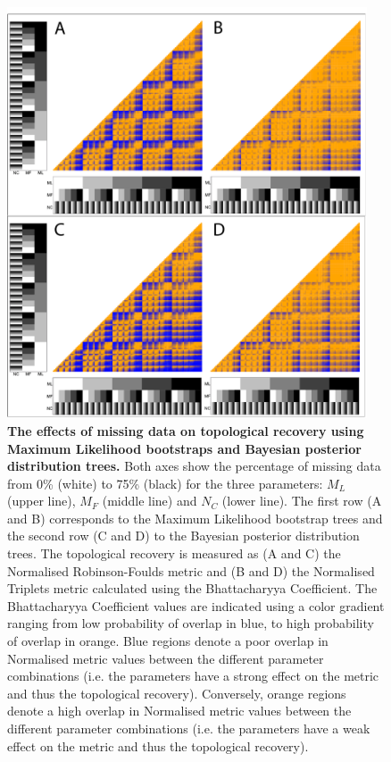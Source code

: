 \begin{figure}[!]
\centering
    \includegraphics[width=0.95\textwidth]{TEM/Figures/Fig7_double.pdf}
\caption[Effects of missing data on topological recovery using Maximum Likelihood bootstraps and Bayesian posterior distribution trees]{\textbf{The effects of missing data on topological recovery using Maximum Likelihood bootstraps and Bayesian posterior distribution trees.} Both axes show the percentage of missing data from 0\% (white) to 75\% (black) for the three parameters: $M_{L}$ (upper line), $M_{F}$ (middle line) and $N_{C}$ (lower line). The first row (A and B) corresponds to the Maximum Likelihood bootstrap trees and the second row (C and D) to the Bayesian posterior distribution trees. The topological recovery is measured as (A and C) the Normalised Robinson-Foulds metric and (B and D) the Normalised Triplets metric calculated using the Bhattacharyya Coefficient. The Bhattacharyya Coefficient values are indicated using a color gradient ranging from low probability of overlap in blue, to high probability of overlap in orange. Blue regions denote a poor overlap in Normalised metric values between the different parameter combinations (i.e. the parameters have a strong effect on the metric and thus the topological recovery). Conversely, orange regions denote a high overlap in Normalised metric values between the different parameter combinations (i.e. the parameters have a weak effect on the metric and thus the topological recovery).}
\label{Fig_Results-paircomp_within2}
\end{figure}



